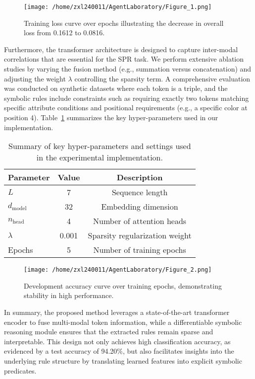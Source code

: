 \documentclass{article}
\begin{document}
\begin{figure}[h]
\caption{Training loss curve over epochs illustrating the decrease in overall loss from 0.1612 to 0.0816.}
\centering
\texttt{[image: /home/zxl240011/AgentLaboratory/Figure\_1.png]}
\label{fig:fig1}
\end{figure}

Furthermore, the transformer architecture is designed to capture inter-modal correlations that are essential for the SPR task. We perform extensive ablation studies by varying the fusion method (e.g., summation versus concatenation) and adjusting the weight \(\lambda\) controlling the sparsity term. A comprehensive evaluation was conducted on synthetic datasets where each token is a triple, and the symbolic rules include constraints such as requiring exactly two tokens matching specific attribute conditions and positional requirements (e.g., a specific color at position 4). Table~\ref{tab:methods} summarizes the key hyper-parameters used in our implementation.

\begin{table}[h]
\centering
\begin{tabular}{lcc}
\hline
Parameter & Value & Description \\
\hline
\(L\) & 7 & Sequence length \\
\(d_{\text{model}}\) & 32 & Embedding dimension \\
\(n_{\text{head}}\) & 4 & Number of attention heads \\
\( \lambda \) & 0.001 & Sparsity regularization weight \\
Epochs & 5 & Number of training epochs \\
\hline
\end{tabular}
\caption{Summary of key hyper-parameters and settings used in the experimental implementation.}
\label{tab:methods}
\end{table}

\begin{figure}[h]
\caption{Development accuracy curve over training epochs, demonstrating stability in high performance.}
\centering
\texttt{[image: /home/zxl240011/AgentLaboratory/Figure\_2.png]}
\label{fig:fig2}
\end{figure}

In summary, the proposed method leverages a state-of-the-art transformer encoder to fuse multi-modal token information, while a differentiable symbolic reasoning module ensures that the extracted rules remain sparse and interpretable. This design not only achieves high classification accuracy, as evidenced by a test accuracy of 94.20\%, but also facilitates insights into the underlying rule structure by translating learned features into explicit symbolic predicates.
\end{document}
